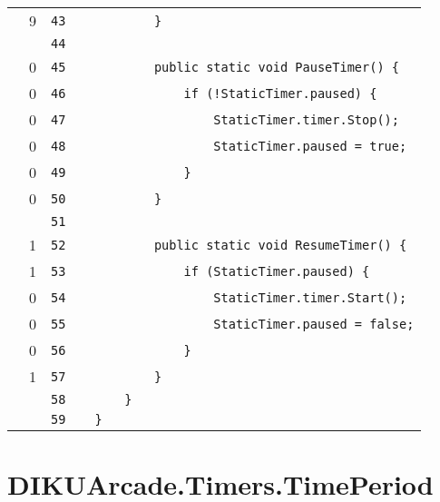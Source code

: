 \documentclass[a4paper,landscape,10pt]{article}
\begin{document}
\begin{longtable}[l]{lrrll}
\cellcolor{green} & 9 & \verb~43~ & & \verb~        }~\\
\cellcolor{gray} &  & \verb~44~ & & \verb~~\\
\cellcolor{red} & 0 & \verb~45~ & & \verb~        public static void PauseTimer() {~\\
\cellcolor{red} & 0 & \verb~46~ & & \verb~            if (!StaticTimer.paused) {~\\
\cellcolor{red} & 0 & \verb~47~ & & \verb~                StaticTimer.timer.Stop();~\\
\cellcolor{red} & 0 & \verb~48~ & & \verb~                StaticTimer.paused = true;~\\
\cellcolor{red} & 0 & \verb~49~ & & \verb~            }~\\
\cellcolor{red} & 0 & \verb~50~ & & \verb~        }~\\
\cellcolor{gray} &  & \verb~51~ & & \verb~~\\
\cellcolor{green} & 1 & \verb~52~ & & \verb~        public static void ResumeTimer() {~\\
\cellcolor{orange} & 1 & \verb~53~ & & \verb~            if (StaticTimer.paused) {~\\
\cellcolor{red} & 0 & \verb~54~ & & \verb~                StaticTimer.timer.Start();~\\
\cellcolor{red} & 0 & \verb~55~ & & \verb~                StaticTimer.paused = false;~\\
\cellcolor{red} & 0 & \verb~56~ & & \verb~            }~\\
\cellcolor{green} & 1 & \verb~57~ & & \verb~        }~\\
\cellcolor{gray} &  & \verb~58~ & & \verb~    }~\\
\cellcolor{gray} &  & \verb~59~ & & \verb~}~\\
\end{longtable}
\newpage
\section{DIKUArcade.Timers.TimePeriod}
\end{document}
